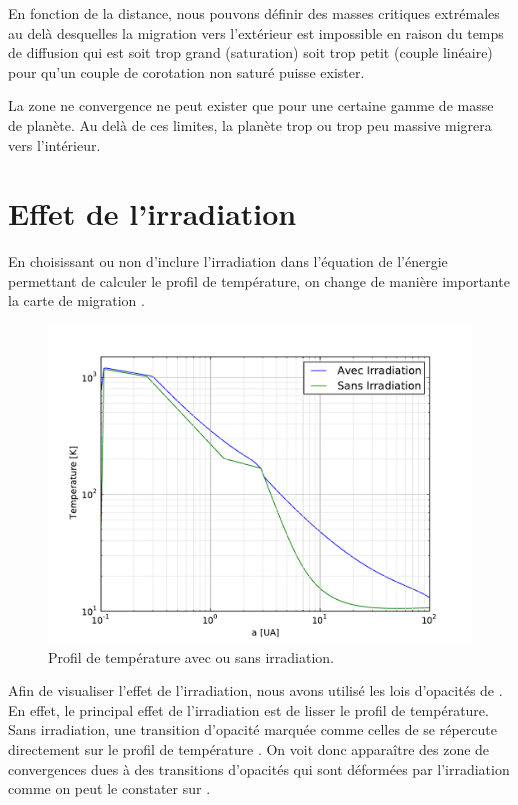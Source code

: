 En fonction de la distance, nous pouvons définir des masses critiques extrémales au delà desquelles la migration vers
l'extérieur est impossible en raison du temps de diffusion qui est soit trop grand (saturation) soit trop petit (couple
linéaire) pour qu'un couple de corotation non saturé puisse exister.

La zone ne convergence ne peut exister que pour une certaine gamme de masse de planète. Au delà de ces limites, la planète trop ou trop peu massive migrera vers l'intérieur.

\section{Effet de l'irradiation}
En choisissant ou non d'inclure l'irradiation dans l'équation de l'énergie permettant de calculer le profil de température, on
change de manière importante la carte de migration \citep{bitsch2013stellar}. 


\begin{figure}[htbp]
\centering
\includegraphics[width=0.6\linewidth]{figure/migration_map/temperature_with_irradiation.pdf}
\caption{Profil de température avec ou sans irradiation. }\label{fig:temp_profile_irradiation}
\end{figure}


Afin de visualiser l'effet de l'irradiation, nous avons utilisé les lois d'opacités de \cite{bell1994FU}. En effet,
le principal effet de l'irradiation est de lisser le profil de température. Sans irradiation, une transition d'opacité marquée
comme celles de \cite{bell1994FU} se répercute directement sur le profil de température .
On voit donc apparaître des zone de convergences dues à des transitions d'opacités qui sont déformées par
l'irradiation comme on peut le constater sur .


